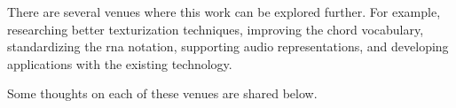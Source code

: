 
There are several venues where this work can be explored
further. For example, researching better texturization
techniques, improving the chord vocabulary, standardizing
the \gls{rna} notation, supporting audio representations,
and developing applications with the existing technology.

Some thoughts on each of these venues are shared below.
